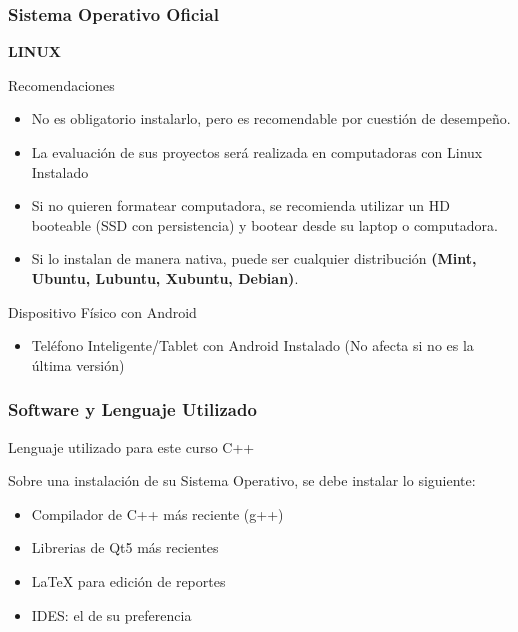 \begin{frame}
\frametitle{Sistema Operativo Oficial}

\textbf{LINUX}
\begin{block}{Recomendaciones}
\begin{itemize}
\item No es obligatorio instalarlo, pero es recomendable por cuestión de desempeño.
\item La evaluaci\'on de sus proyectos ser\'a realizada en computadoras con Linux Instalado
\item Si no quieren formatear computadora, se recomienda utilizar un HD booteable (SSD con persistencia) y bootear desde su laptop o computadora.

\item Si lo instalan de manera nativa, puede ser cualquier distribución \textbf{(Mint, Ubuntu, Lubuntu, Xubuntu, Debian)}.
\end{itemize}
\end{block}
\begin{block}{Dispositivo Físico con Android}
\begin{itemize}
\item Teléfono Inteligente/Tablet con Android Instalado (No afecta si no es la última versión)
\end{itemize}
\end{block}
\end{frame}


\begin{frame}
\frametitle{Software y Lenguaje Utilizado}
\begin{block}{Lenguaje utilizado para este curso}
C++
\end{block}
Sobre una instalación de su Sistema Operativo, se debe instalar lo siguiente:
\begin{itemize}
\item Compilador de C++ m\'as reciente (g++)
\item Librerias de Qt5 m\'as recientes 
\item LaTeX para edición de reportes
\item IDES: el de su preferencia
\end{itemize}
\end{frame}


